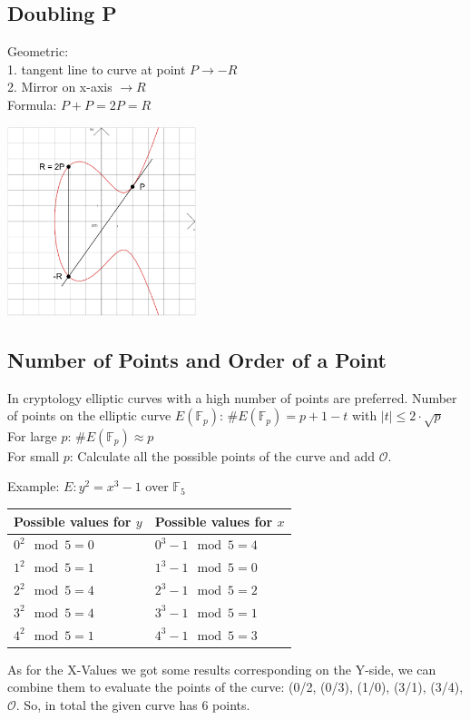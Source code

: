 \begin{minipage}{12.5cm}
\subsection{Doubling P}
Geometric:\\
1. tangent line to curve at point $P \to -R$\\
2. Mirror on x-axis $\to R$\\
Formula: $P+P=2P=R$
\end{minipage}
\begin{minipage}{5.5cm}
	\includegraphics[width=5.5cm]{./bilder/ellipticCurveDoubling.png}
\end{minipage}

\subsection{Number of Points and Order of a Point}
In cryptology elliptic curves with a high number of points are preferred.
Number of points on the elliptic curve $E(\mathbb{F}_p)$: $\#E(\mathbb{F}_p)=p+1-t$ with $|t| \leq 2 \cdot \sqrt{p}$ \\
For large $p$:  $\#E(\mathbb{F}_p) \approx p $ \\
For small $p$:  Calculate all the possible points of the curve and add $\mathcal{O}$.\\
\begin{minipage}{8cm}
	Example: $E: y^2=x^3-1$ over $\mathbb{F}_5$\\
	\begin{tabular}{|l |l|}
		\hline
		Possible values for $y$	&	Possible values for $x$\\
		\hline
		$0^2 \mod 5 = 0$		&	$0^3 - 1 \mod 5 = 4$\\
		\hline
		$1^2 \mod 5 = 1$		&	$1^3 - 1 \mod 5 = 0$\\
		\hline
		$2^2 \mod 5 = 4$		&	$2^3 - 1 \mod 5 = 2$\\
		\hline
		$3^2 \mod 5 = 4$		&	$3^3 - 1 \mod 5 = 1$\\
		\hline
		$4^2 \mod 5 = 1$		&	$4^3 - 1 \mod 5 = 3$\\
		\hline
	\end{tabular}
\end{minipage}
\begin{minipage}{10cm}
	As for the X-Values we got some results corresponding on the Y-side, we can combine them to evaluate the points of the curve: (0/2, (0/3), (1/0), (3/1), (3/4), $\mathcal{O}$.
	So, in total the given curve has 6 points.\\
\end{minipage}\\

